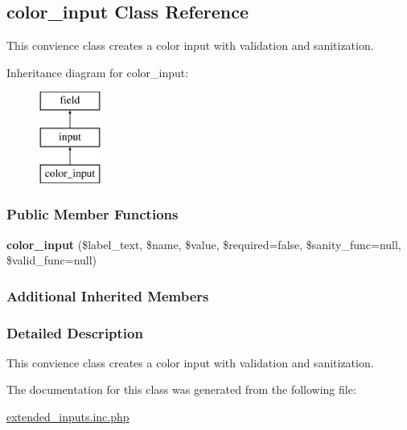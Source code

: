\hypertarget{classcolor__input}{\subsection{color\-\_\-input Class Reference}
\label{classcolor__input}
}


This convience class creates a color input with validation and sanitization.  


Inheritance diagram for color\-\_\-input\-:\begin{figure}[H]
\begin{center}
\leavevmode
\includegraphics[height=3.000000cm]{classcolor__input}
\end{center}
\end{figure}
\subsubsection*{Public Member Functions}
\begin{DoxyCompactItemize}
\item 
\hypertarget{classcolor__input_a224f6d27ca95b30d5122b9360a0064c6}{{\bfseries color\-\_\-input} (\$label\-\_\-text, \$name, \$value, \$required=false, \$sanity\-\_\-func=null, \$valid\-\_\-func=null)}\label{classcolor__input_a224f6d27ca95b30d5122b9360a0064c6}

\end{DoxyCompactItemize}
\subsubsection*{Additional Inherited Members}


\subsubsection{Detailed Description}
This convience class creates a color input with validation and sanitization. 

The documentation for this class was generated from the following file\-:\begin{DoxyCompactItemize}
\item 
\hyperlink{extended__inputs_8inc_8php}{extended\-\_\-inputs.\-inc.\-php}\end{DoxyCompactItemize}
